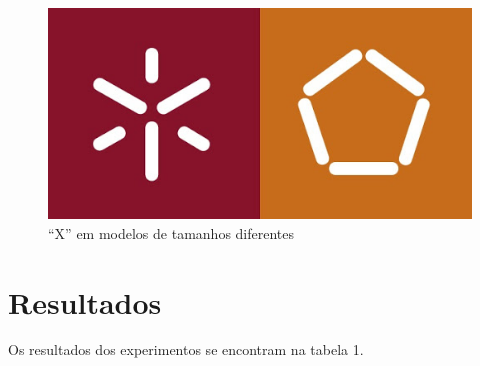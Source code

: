 \documentclass{llncs}
\begin{document}
\begin{figure}[ht]
\includegraphics[scale=0.5]{uminho.jpg}
\centering
\caption{\enquote{X} em modelos de tamanhos diferentes}
\label{fig:xs}
\end{figure}

%
\section{Resultados}
%
Os resultados dos experimentos se encontram na tabela 1. 
\end{document}
